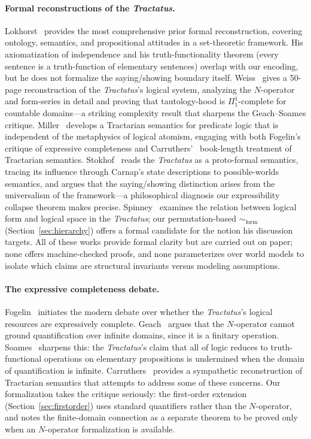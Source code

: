 \documentclass[10pt, letterpaper]{article}
\theoremstyle{definition}
\theoremstyle{remark}
\newcommand{\formEq}{\sim_{\mathrm{form}}}
\begin{document}
\paragraph{Formal reconstructions of the \emph{Tractatus}.}
Lokhorst~\cite{lokhorst1988} provides the most comprehensive
prior formal reconstruction, covering ontology, semantics, and
propositional attitudes in a set-theoretic framework.  His
axiomatization of independence and his truth-functionality
theorem (every sentence is a truth-function of elementary
sentences) overlap with our encoding, but he does not formalize
the saying/showing boundary itself.
Weiss~\cite{weiss2017} gives a 50-page reconstruction of the
\emph{Tractatus}'s logical system, analyzing the $N$-operator
and form-series in detail and proving that tautology-hood is
$\Pi^1_1$-complete for countable domains---a striking
complexity result that sharpens the Geach--Soames critique.
Miller~\cite{miller1995} develops a Tractarian semantics for
predicate logic that is independent of the metaphysics of
logical atomism, engaging with both Fogelin's~\cite{fogelin1987}
critique of expressive completeness and Carruthers'~\cite{carruthers1989}
book-length treatment of Tractarian semantics.
Stokhof~\cite{stokhof2008} reads the \emph{Tractatus} as a
proto-formal semantics, tracing its influence through Carnap's
state descriptions to possible-worlds semantics, and argues
that the saying/showing distinction arises from the
universalism of the framework---a philosophical diagnosis our
expressibility collapse theorem makes precise.
Spinney~\cite{spinney2022} examines the relation between logical
form and logical space in the \emph{Tractatus}; our
permutation-based $\formEq$ (Section~\ref{sec:hierarchy})
offers a formal candidate for the notion his discussion
targets.
All of these works provide formal clarity but are carried out
on paper; none offers machine-checked proofs, and none
parameterizes over world models to isolate which claims are
structural invariants versus modeling assumptions.

\paragraph{The expressive completeness debate.}
Fogelin~\cite{fogelin1987} initiates the modern debate over
whether the \emph{Tractatus}'s logical resources are
expressively complete.  Geach~\cite{geach1981} argues that the
$N$-operator cannot ground quantification over infinite domains,
since it is a finitary operation.
Soames~\cite{soames1983} sharpens this: the \emph{Tractatus}'s
claim that all of logic reduces to truth-functional operations
on elementary propositions is undermined when the domain of
quantification is infinite.
Carruthers~\cite{carruthers1989} provides a sympathetic
reconstruction of Tractarian semantics that attempts to address
some of these concerns.
Our formalization takes the critique seriously: the first-order
extension (Section~\ref{sec:firstorder}) uses standard
quantifiers rather than the $N$-operator, and notes the
finite-domain connection as a separate theorem to be proved only
when an $N$-operator formalization is available.
\end{document}
